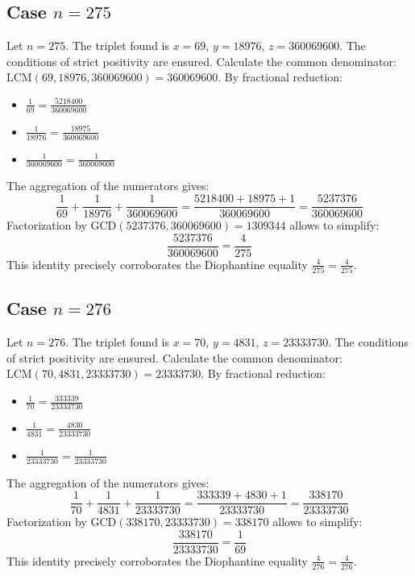 \documentclass[11pt,a4paper]{article}
\begin{document}
\subsection{Case $n = 275$}
Let $n = 275$. The triplet found is $x = 69$, $y = 18976$, $z = 360069600$.
The conditions of strict positivity are ensured.
Calculate the common denominator: $\text{LCM}(69, 18976, 360069600) = 360069600$.
By fractional reduction:
\begin{itemize}
    \item $\frac{1}{69} = \frac{5218400}{360069600}$
    \item $\frac{1}{18976} = \frac{18975}{360069600}$
    \item $\frac{1}{360069600} = \frac{1}{360069600}$
\end{itemize}
The aggregation of the numerators gives:
$$ \frac{1}{69} + \frac{1}{18976} + \frac{1}{360069600} = \frac{5218400 + 18975 + 1}{360069600} = \frac{5237376}{360069600} $$
Factorization by $\text{GCD}(5237376, 360069600) = 1309344$ allows to simplify:
$$ \frac{5237376}{360069600} = \frac{4}{275} $$
This identity precisely corroborates the Diophantine equality $\frac{4}{275} = \frac{4}{275}$.

\subsection{Case $n = 276$}
Let $n = 276$. The triplet found is $x = 70$, $y = 4831$, $z = 23333730$.
The conditions of strict positivity are ensured.
Calculate the common denominator: $\text{LCM}(70, 4831, 23333730) = 23333730$.
By fractional reduction:
\begin{itemize}
    \item $\frac{1}{70} = \frac{333339}{23333730}$
    \item $\frac{1}{4831} = \frac{4830}{23333730}$
    \item $\frac{1}{23333730} = \frac{1}{23333730}$
\end{itemize}
The aggregation of the numerators gives:
$$ \frac{1}{70} + \frac{1}{4831} + \frac{1}{23333730} = \frac{333339 + 4830 + 1}{23333730} = \frac{338170}{23333730} $$
Factorization by $\text{GCD}(338170, 23333730) = 338170$ allows to simplify:
$$ \frac{338170}{23333730} = \frac{1}{69} $$
This identity precisely corroborates the Diophantine equality $\frac{4}{276} = \frac{4}{276}$.
\end{document}
